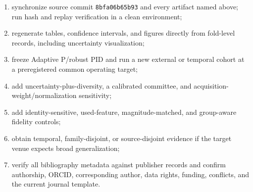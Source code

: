 \begin{enumerate}
    \item synchronize source commit \texttt{8bfa06b65b93} and every artifact
    named above; run hash and replay verification in a clean environment;
    \item regenerate tables, confidence intervals, and figures directly from
    fold-level records, including uncertainty visualization;
    \item freeze Adaptive P/robust PID and run a new external or temporal cohort
    at a preregistered common operating target;
    \item add uncertainty-plus-diversity, a calibrated committee, and
    acquisition-weight/normalization sensitivity;
    \item add identity-sensitive, used-feature, magnitude-matched, and
    group-aware fidelity controls;
    \item obtain temporal, family-disjoint, or source-disjoint evidence if the
    target venue expects broad generalization;
    \item verify all bibliography metadata against publisher records and confirm
    authorship, ORCID, corresponding author, data rights, funding, conflicts, and
    the current journal template.
\end{enumerate}
